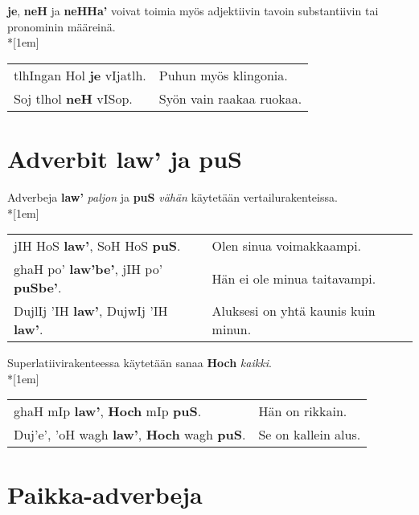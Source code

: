 \documentclass{book}
\begin{document}
\textbf{je}, \textbf{neH} ja \textbf{neHHa'} voivat toimia myös adjektiivin tavoin substantiivin tai pronominin määreinä.\\*[1em]
\begin{tabular}{l l}
    tlhIngan Hol \textbf{je} vIjatlh. & Puhun myös klingonia. \\
    Soj tlhol \textbf{neH} vISop. & Syön vain raakaa ruokaa. \\
\end{tabular}


\section{Adverbit law' ja puS}

Adverbeja \textbf{law'} \textit{paljon} ja \textbf{puS} \textit{vähän} käytetään vertailurakenteissa.
\\*[1em]
\begin{tabular}{l l}
    jIH HoS \textbf{law'}, SoH HoS \textbf{puS}. & Olen sinua voimakkaampi. \\
    ghaH po' \textbf{law'be'}, jIH po' \textbf{puSbe'}. & Hän ei ole minua taitavampi. \\
    DujlIj 'IH \textbf{law'}, DujwIj 'IH \textbf{law'}. & Aluksesi on yhtä kaunis kuin minun. \\
\end{tabular}

Superlatiivirakenteessa käytetään sanaa \textbf{Hoch} \textit{kaikki}.
\\*[1em]
\begin{tabular}{l l}
    ghaH mIp \textbf{law'}, \textbf{Hoch} mIp \textbf{puS}. & Hän on rikkain. \\
    Duj'e', 'oH wagh \textbf{law'}, \textbf{Hoch} wagh \textbf{puS}. & Se on kallein alus. \\
\end{tabular}

\section{Paikka-adverbeja}
\end{document}
